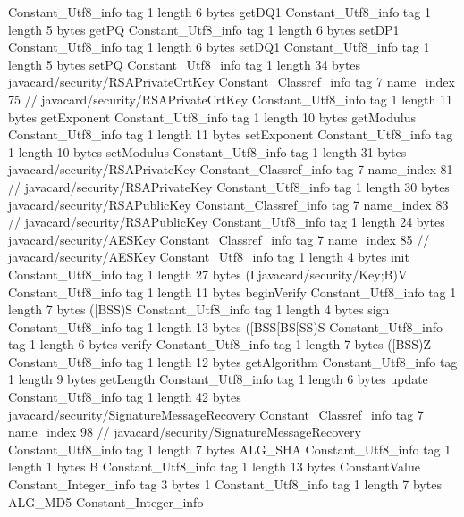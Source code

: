 {{{		}
		Constant_Utf8_info {
			tag	1
			length	6
			bytes	getDQ1
		}
		Constant_Utf8_info {
			tag	1
			length	5
			bytes	getPQ
		}
		Constant_Utf8_info {
			tag	1
			length	6
			bytes	setDP1
		}
		Constant_Utf8_info {
			tag	1
			length	6
			bytes	setDQ1
		}
		Constant_Utf8_info {
			tag	1
			length	5
			bytes	setPQ
		}
		Constant_Utf8_info {
			tag	1
			length	34
			bytes	javacard/security/RSAPrivateCrtKey
		}
		Constant_Classref_info {
			tag	7
			name_index	75		// javacard/security/RSAPrivateCrtKey
		}
		Constant_Utf8_info {
			tag	1
			length	11
			bytes	getExponent
		}
		Constant_Utf8_info {
			tag	1
			length	10
			bytes	getModulus
		}
		Constant_Utf8_info {
			tag	1
			length	11
			bytes	setExponent
		}
		Constant_Utf8_info {
			tag	1
			length	10
			bytes	setModulus
		}
		Constant_Utf8_info {
			tag	1
			length	31
			bytes	javacard/security/RSAPrivateKey
		}
		Constant_Classref_info {
			tag	7
			name_index	81		// javacard/security/RSAPrivateKey
		}
		Constant_Utf8_info {
			tag	1
			length	30
			bytes	javacard/security/RSAPublicKey
		}
		Constant_Classref_info {
			tag	7
			name_index	83		// javacard/security/RSAPublicKey
		}
		Constant_Utf8_info {
			tag	1
			length	24
			bytes	javacard/security/AESKey
		}
		Constant_Classref_info {
			tag	7
			name_index	85		// javacard/security/AESKey
		}
		Constant_Utf8_info {
			tag	1
			length	4
			bytes	init
		}
		Constant_Utf8_info {
			tag	1
			length	27
			bytes	(Ljavacard/security/Key;B)V
		}
		Constant_Utf8_info {
			tag	1
			length	11
			bytes	beginVerify
		}
		Constant_Utf8_info {
			tag	1
			length	7
			bytes	([BSS)S
		}
		Constant_Utf8_info {
			tag	1
			length	4
			bytes	sign
		}
		Constant_Utf8_info {
			tag	1
			length	13
			bytes	([BSS[BS[SS)S
		}
		Constant_Utf8_info {
			tag	1
			length	6
			bytes	verify
		}
		Constant_Utf8_info {
			tag	1
			length	7
			bytes	([BSS)Z
		}
		Constant_Utf8_info {
			tag	1
			length	12
			bytes	getAlgorithm
		}
		Constant_Utf8_info {
			tag	1
			length	9
			bytes	getLength
		}
		Constant_Utf8_info {
			tag	1
			length	6
			bytes	update
		}
		Constant_Utf8_info {
			tag	1
			length	42
			bytes	javacard/security/SignatureMessageRecovery
		}
		Constant_Classref_info {
			tag	7
			name_index	98		// javacard/security/SignatureMessageRecovery
		}
		Constant_Utf8_info {
			tag	1
			length	7
			bytes	ALG_SHA
		}
		Constant_Utf8_info {
			tag	1
			length	1
			bytes	B
		}
		Constant_Utf8_info {
			tag	1
			length	13
			bytes	ConstantValue
		}
		Constant_Integer_info {
			tag	3
			bytes	1
		}
		Constant_Utf8_info {
			tag	1
			length	7
			bytes	ALG_MD5
		}
		Constant_Integer_info {
}}}
